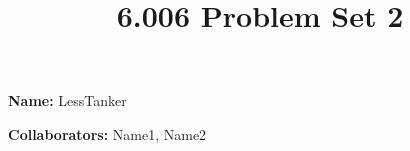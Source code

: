 \documentclass[12pt,twoside]{article}
\title{6.006 Problem Set 2}
\newcommand{\theproblemsetnum}{2}
\begin{document}

\setlength{\parindent}{0pt}
\medskip\hrulefill\medskip

{\bf Name:} LessTanker

\medskip

{\bf Collaborators:} Name1, Name2

\medskip\hrulefill






\end{document}
